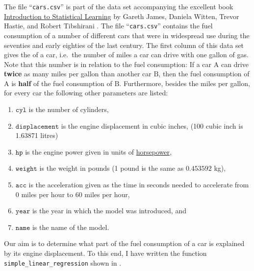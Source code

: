 The file ``\texttt{cars.csv}'' is part of the data set accompanying the excellent book 
\href{http://faculty.marshall.usc.edu/gareth-james/ISL/}{Introduction to Statistical Learning} by Gareth James,
Daniela Witten, Trevor Hastie, and Robert Tibshirani \cite{james:2014}.  The file 
``\texttt{cars.csv}''  contains the fuel consumption of a number of different cars that were in widespread use during
the seventies and early eighties of the last century.  The first column of this data set gives the 
 of a car, i.e.~the number of miles a car can drive with one gallon of gas.  Note that
this number is in  relation to the fuel consumption:  If a car $\mathrm{A}$ can drive \textbf{twice} as many miles per gallon
than another car $\mathrm{B}$, then the fuel consumption of $\mathrm{A}$ is \textbf{half} of the fuel consumption of
$\mathrm{B}$. Furthermore, besides the miles per gallon, for every car the following other parameters are listed:
\begin{enumerate}
\item $\mathtt{cyl}$ is the number of cylinders,
\item $\mathtt{displacement}$ is the engine displacement in cubic inches, 
      (100 cubic inch is 1.63871 litres)
\item $\mathtt{hp}$ is the engine power given in units of \href{https://en.wikipedia.org/wiki/Horsepower}{horsepower},
\item $\mathtt{weight}$ is the weight in pounds (1 pound is the same as $0.453592$ kg),
\item $\mathtt{acc}$ is the acceleration given as the time in seconds needed to accelerate from 0 miles per
      hour to 60 miles per hour,
\item $\mathtt{year}$ is the year in which the model was introduced, and
\item $\mathtt{name}$ is the name of the model.
\end{enumerate}
Our aim is to determine what part of the fuel consumption of a car is explained by its engine displacement.
To this end, I have written the function \texttt{simple\_linear\_regression} shown in .


